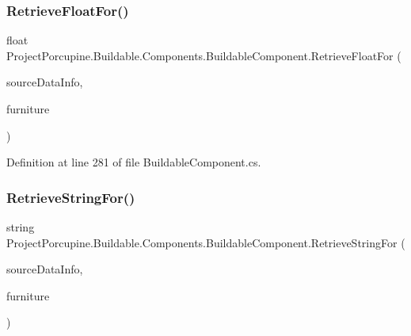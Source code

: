 \subsubsection{\texorpdfstring{Retrieve\+Float\+For()}{RetrieveFloatFor()}}
{\footnotesize\ttfamily float Project\+Porcupine.\+Buildable.\+Components.\+Buildable\+Component.\+Retrieve\+Float\+For (\begin{DoxyParamCaption}\item[{\hyperlink{class_project_porcupine_1_1_buildable_1_1_components_1_1_buildable_component_1_1_source_data_info}{Source\+Data\+Info}}]{source\+Data\+Info,  }\item[{\hyperlink{class_furniture}{Furniture}}]{furniture }\end{DoxyParamCaption})\hspace{0.3cm}{\ttfamily [protected]}}



Definition at line 281 of file Buildable\+Component.\+cs.

\mbox{\label{class_project_porcupine_1_1_buildable_1_1_components_1_1_buildable_component_a255b41979e606cf16e7d6fec11f8c6bd}} 
\subsubsection{\texorpdfstring{Retrieve\+String\+For()}{RetrieveStringFor()}}
{\footnotesize\ttfamily string Project\+Porcupine.\+Buildable.\+Components.\+Buildable\+Component.\+Retrieve\+String\+For (\begin{DoxyParamCaption}\item[{\hyperlink{class_project_porcupine_1_1_buildable_1_1_components_1_1_buildable_component_1_1_source_data_info}{Source\+Data\+Info}}]{source\+Data\+Info,  }\item[{\hyperlink{class_furniture}{Furniture}}]{furniture }\end{DoxyParamCaption})\hspace{0.3cm}{\ttfamily [protected]}}



